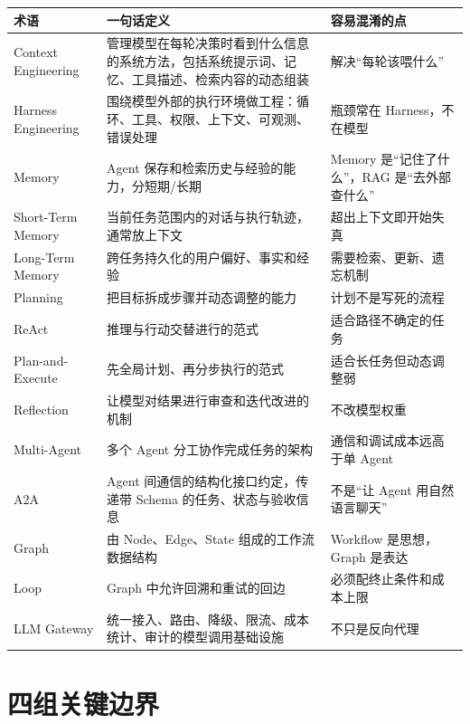 \documentclass[9pt,a4paper,twocolumn]{ctexart}
\begin{document}
{\footnotesize
\begin{tabular}{|p{}|p{}|p{}|}
\hline
\textbf{术语} & \textbf{一句话定义} & \textbf{容易混淆的点} \\
\hline
Context Engineering & 管理模型在每轮决策时看到什么信息的系统方法，包括系统提示词、记忆、工具描述、检索内容的动态组装 & 解决“每轮该喂什么” \\
\hline
Harness Engineering & 围绕模型外部的执行环境做工程：循环、工具、权限、上下文、可观测、错误处理 & 瓶颈常在 Harness，不在模型 \\
\hline
Memory & Agent 保存和检索历史与经验的能力，分短期/长期 & Memory 是“记住了什么”，RAG 是“去外部查什么” \\
\hline
Short-Term Memory & 当前任务范围内的对话与执行轨迹，通常放上下文 & 超出上下文即开始失真 \\
\hline
Long-Term Memory & 跨任务持久化的用户偏好、事实和经验 & 需要检索、更新、遗忘机制 \\
\hline
Planning & 把目标拆成步骤并动态调整的能力 & 计划不是写死的流程 \\
\hline
ReAct & 推理与行动交替进行的范式 & 适合路径不确定的任务 \\
\hline
Plan-and-Execute & 先全局计划、再分步执行的范式 & 适合长任务但动态调整弱 \\
\hline
Reflection & 让模型对结果进行审查和迭代改进的机制 & 不改模型权重 \\
\hline
Multi-Agent & 多个 Agent 分工协作完成任务的架构 & 通信和调试成本远高于单 Agent \\
\hline
A2A & Agent 间通信的结构化接口约定，传递带 Schema 的任务、状态与验收信息 & 不是“让 Agent 用自然语言聊天” \\
\hline
Graph & 由 Node、Edge、State 组成的工作流数据结构 & Workflow 是思想，Graph 是表达 \\
\hline
Loop & Graph 中允许回溯和重试的回边 & 必须配终止条件和成本上限 \\
\hline
LLM Gateway & 统一接入、路由、降级、限流、成本统计、审计的模型调用基础设施 & 不只是反向代理 \\
\hline
\end{tabular}
}



\section*{四组关键边界}
\end{document}

